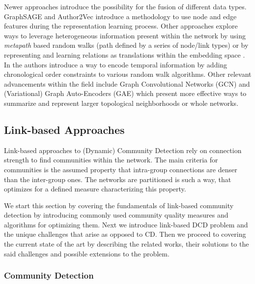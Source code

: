 \documentclass[
acmsmall,
nonacm,
screen,
acmthm]{../../scripts/pandoc/templates/acmart}
\begin{document}
Newer approaches introduce the possibility for the fusion of different
data types. GraphSAGE
\citep{hamiltonInductiveRepresentationLearning2018} and Author2Vec
\citep{wuAuthor2VecFrameworkGenerating2020} introduce a methodology to
use node and edge features during the representation learning process.
Other approaches explore ways to leverage heterogeneous information
present within the network by using \emph{metapath} based random walks
(path defined by a series of node/link types)
\citep{dongMetapath2vecScalableRepresentation2017} or by representing
and learning relations as translations within the embedding space
\citep{bordesTranslatingEmbeddingsModeling2013}. In
\citet{nguyenContinuousTimeDynamicNetwork2018} the authors introduce a
way to encode temporal information by adding chronological order
constraints to various random walk algorithms. Other relevant
advancements within the field include Graph Convolutional Networks (GCN)
\citep{kipfSemiSupervisedClassificationGraph2017a} and (Variational)
Graph Auto-Encoders (GAE) \citep{kipfVariationalGraphAutoEncoders2016}
which present more effective ways to summarize and represent larger
topological neighborhoods or whole networks.

\hypertarget{link-based-approaches}{%
\subsection{Link-based Approaches}\label{link-based-approaches}}

Link-based approaches to (Dynamic) Community Detection rely on
connection strength to find communities within the network. The main
criteria for communities is the assumed property that intra-group
connections are denser than the inter-group ones. The networks are
partitioned is such a way, that optimizes for a defined measure
characterizing this property.

We start this section by covering the fundamentals of link-based
community detection by introducing commonly used community quality
measures and algorithms for optimizing them. Next we introduce
link-based DCD problem and the unique challenges that arise as opposed
to CD. Then we proceed to covering the current state of the art by
describing the related works, their solutions to the said challenges and
possible extensions to the problem.

\hypertarget{community-detection-1}{%
\subsubsection{Community Detection}\label{community-detection-1}}
\end{document}
